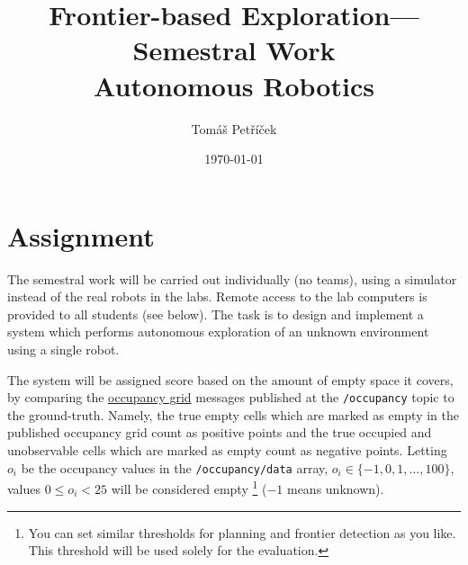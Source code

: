 \documentclass[a4paper]{article}
\title{
Frontier-based Exploration---Semestral Work\\
\vspace{0.25em}
\Large Autonomous Robotics
}
\author{Tom{\'a}{\v s} Pet{\v r}{\'i}{\v c}ek}
\date{\today}
\newcommand{\file}[1]{\texttt{#1}}
\begin{document}
\maketitle


\section{Assignment}

The semestral work will be carried out individually (no teams), using a simulator instead of the real robots in the labs.
Remote access to the lab computers is provided to all students (see below).
The task is to design and implement a system which performs autonomous exploration of an unknown environment using a single robot.

The system will be assigned score based on the amount of empty space it covers,
by comparing the \href{http://docs.ros.org/melodic/api/nav_msgs/html/msg/OccupancyGrid.html}{occupancy grid} messages published at the
\file{/occupancy}
topic to the ground-truth.
Namely, the true empty cells which are marked as empty in the published occupancy grid count as positive points and the true occupied and unobservable cells which are marked as empty count as negative points.
Letting $o_i$ be the occupancy values in the
\file{/occupancy/data}
array, $o_i \in \{-1, 0, 1, \ldots, 100\}$, values $0 \le o_i < 25$ will be considered empty%
\footnote{You can set similar thresholds for planning and frontier detection as you like.
This threshold will be used solely for the evaluation.}
($-1$ means unknown).
\end{document}
